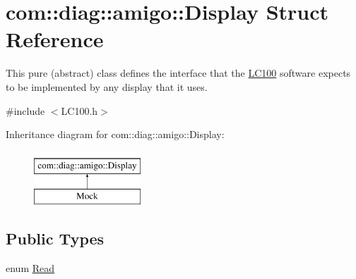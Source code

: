 \hypertarget{structcom_1_1diag_1_1amigo_1_1Display}{
\section{com::diag::amigo::Display Struct Reference}
\label{structcom_1_1diag_1_1amigo_1_1Display}
}


This pure (abstract) class defines the interface that the \hyperlink{classcom_1_1diag_1_1amigo_1_1LC100}{LC100} software expects to be implemented by any display that it uses.  




{\ttfamily \#include $<$LC100.h$>$}

Inheritance diagram for com::diag::amigo::Display:\begin{figure}[H]
\begin{center}
\leavevmode
\includegraphics[height=2cm]{structcom_1_1diag_1_1amigo_1_1Display}
\end{center}
\end{figure}
\subsection*{Public Types}
\begin{DoxyCompactItemize}
\item 
enum \hyperlink{structcom_1_1diag_1_1amigo_1_1Display_a57e9915682f8aeb77066171c97c58288}{Read} 
\end{DoxyCompactItemize}
